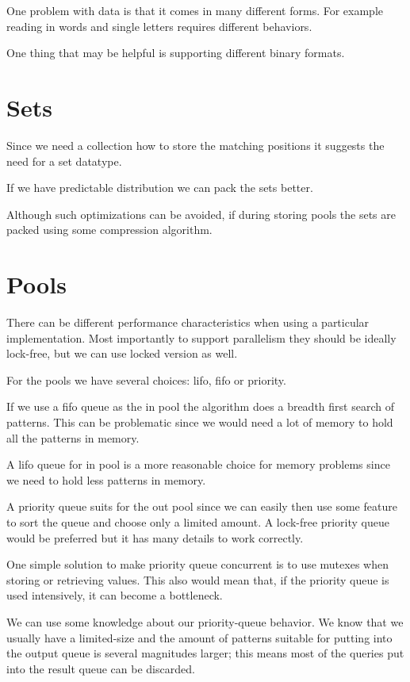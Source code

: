 One problem with data is that it comes in many different forms. For example reading in 
words and single letters requires different behaviors.

One thing that may be helpful is supporting different binary formats.

\section{Sets}

Since we need a collection how to store the matching positions it suggests
the need for a set datatype.

If we have predictable distribution we can pack the sets better. 

Although such optimizations can be avoided, if during storing pools the
sets are packed using some compression algorithm.

\section{Pools}

There can be different performance characteristics when using a particular implementation. 
Most importantly to support parallelism they should be ideally lock-free, but we can use locked version as well.

For the pools we have several choices: lifo, fifo or priority.

If we use a fifo queue as the in pool the algorithm does a breadth first search of patterns.
This can be problematic since we would need a lot of memory to hold all the patterns in memory.

A lifo queue for in pool is a more reasonable choice for memory problems since we need to hold less patterns in memory.

A priority queue suits for the out pool since we can easily then use some feature to sort 
the queue and choose only a limited amount. A lock-free priority queue would be preferred
but it has many details to work correctly. 

One simple solution to make priority queue concurrent is to use mutexes when storing or
retrieving values. This also would mean that, if the priority queue is used intensively, it can become a bottleneck.

We can use some knowledge about our priority-queue behavior. We know that we usually
have a limited-size and the amount of patterns suitable for putting into the output
queue is several magnitudes larger; this means most of the queries put into the result queue can be discarded.

